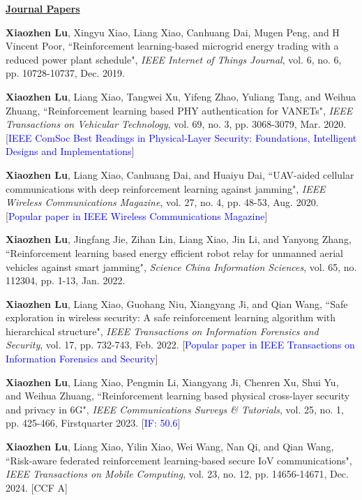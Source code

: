 \documentclass{article}
\newcommand{\pubheading}[1]{\par\bigskip\underline{\textbf{#1}}\par}
\begin{document}
\pubheading{Journal Papers}
\begin{justifying}
\begin{myreferences}
 \item \textbf{Xiaozhen Lu}, Xingyu Xiao, Liang Xiao, Canhuang Dai, Mugen Peng, and H Vincent Poor, ``Reinforcement learning-based microgrid energy trading with a reduced power plant schedule", \emph{IEEE Internet of Things Journal}, vol. 6, no. 6, pp. 10728-10737, Dec. 2019.
 \item \textbf{Xiaozhen Lu}, Liang Xiao, Tangwei Xu, Yifeng Zhao, Yuliang Tang, and Weihua Zhuang, ``Reinforcement learning based PHY authentication for VANETs", \emph{IEEE Transactions on Vehicular Technology}, vol. 69, no. 3, pp. 3068-3079, Mar. 2020. [\textcolor{blue}{IEEE ComSoc Best Readings in Physical-Layer Security: Foundations, Intelligent Designs and Implementations}]
 \item \textbf{Xiaozhen Lu}, Liang Xiao, Canhuang Dai, and Huaiyu Dai, ``UAV-aided cellular communications with deep reinforcement learning against jamming", \emph{IEEE Wireless Communications Magazine}, vol. 27, no. 4, pp. 48-53, Aug. 2020. [\textcolor{blue}{Popular paper in IEEE Wireless Communications Magazine}]
 \item \textbf{Xiaozhen Lu}, Jingfang Jie, Zihan Lin, Liang Xiao, Jin Li, and Yanyong Zhang, ``Reinforcement learning based energy efficient robot relay for unmanned aerial vehicles against smart jamming", \emph{Science China Information Sciences}, vol. 65, no. 112304, pp. 1-13, Jan. 2022.
 \item \textbf{Xiaozhen Lu}, Liang Xiao, Guohang Niu, Xiangyang Ji, and Qian Wang, ``Safe exploration in wireless security: A safe reinforcement learning algorithm with hierarchical structure", \emph{IEEE Transactions on Information Forensics and Security}, vol. 17, pp. 732-743, Feb. 2022. [\textcolor{blue}{Popular paper in IEEE Transactions on Information Forensics and Security}]
 \item \textbf{Xiaozhen Lu}, Liang Xiao, Pengmin Li, Xiangyang Ji, Chenren Xu, Shui Yu, and Weihua Zhuang, ``Reinforcement learning based physical cross-layer security and privacy in 6G", \emph{IEEE Communications Surveys \& Tutorials}, vol. 25, no. 1, pp. 425-466, Firstquarter 2023. [\textcolor{blue}{IF: 50.6}]
 \item \textbf{Xiaozhen Lu}, Liang Xiao, Yilin Xiao, Wei Wang, Nan Qi, and  Qian Wang, ``Risk-aware federated reinforcement learning-based secure IoV communications", \emph{IEEE Transactions on Mobile Computing}, vol. 23, no. 12, pp. 14656-14671, Dec. 2024. [CCF A]

\end{myreferences}
\end{justifying}
\end{document}
